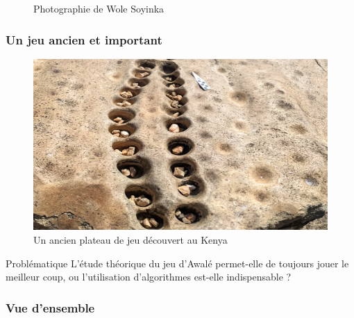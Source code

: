 \message{ !name(test.tex)}\documentclass{beamer}
\begin{document}
\begin{frame}
\begin{minipage}[b]{0.48\linewidth}
\begin{figure}
      \label{fig1}
      \caption{Photographie de Wole Soyinka}
    \end{figure}
  \end{minipage}
      
\end{frame}

\begin{frame}
  \frametitle{Un jeu ancien et important}
  \begin{figure}
    \centering
    \includegraphics[width=\linewidth]{ressources/ancien_plateau_jeu.png}
    \caption{Un ancien plateau de jeu découvert au Kenya}
  \end{figure}
\end{frame}


\begin{frame}
  \begin{block}{Problématique}
    L'étude théorique du jeu d'Awalé permet-elle de toujours jouer le meilleur coup, ou l'utilisation d'algorithmes est-elle indispensable ?
  \end{block}
  \frametitle{Vue d'ensemble}
  \tableofcontents
\end{frame}
\end{document}
